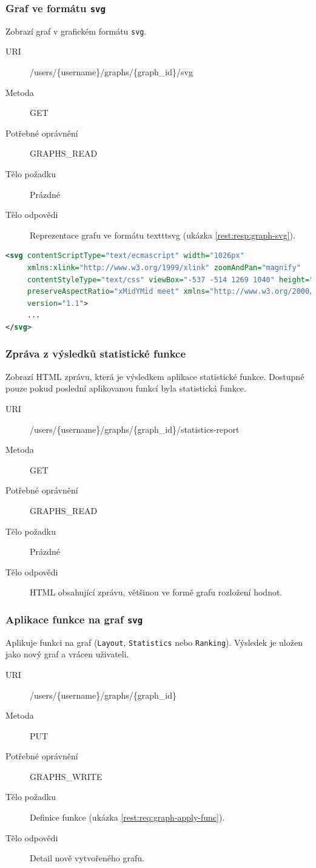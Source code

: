 \documentclass[thesis=M,czech]{FITthesis}[2014/05/6]
\begin{document}
\subsubsection{Graf ve formátu \texttt{svg}}
Zobrazí graf v grafickém formátu \texttt{svg}.
\begin{description}
  \item[URI] /users/\{username\}/graphs/\{graph\_id\}/svg
  \item[Metoda] GET
  \item[Potřebné oprávnění] GRAPHS\_READ
  \item[Tělo požadku] Prázdné
  \item[Tělo odpovědi] Reprezentace grafu ve formátu texttt{svg} (ukázka \ref{rest:resp:graph-svg}). 
\end{description}

\begin{lstlisting}[caption=Tělo odpovědi zdroje /users/\{username\}/graphs/\{graph\_id\}/svg (GET), label=rest:resp:graph-svg, language=xml]
<svg contentScriptType="text/ecmascript" width="1026px"
     xmlns:xlink="http://www.w3.org/1999/xlink" zoomAndPan="magnify"
     contentStyleType="text/css" viewBox="-537 -514 1269 1040" height="841px"
     preserveAspectRatio="xMidYMid meet" xmlns="http://www.w3.org/2000/svg"
     version="1.1">
     ...
</svg>
\end{lstlisting}  

\subsubsection{Zpráva z výsledků statistické funkce}
Zobrazí HTML zprávu, která je výsledkem aplikace statistické funkce. Dostupné pouze pokud poslední aplikovanou funkcí byla statistická funkce.
\begin{description}
  \item[URI] /users/\{username\}/graphs/\{graph\_id\}/statistics-report
  \item[Metoda] GET
  \item[Potřebné oprávnění] GRAPHS\_READ
  \item[Tělo požadku] Prázdné
  \item[Tělo odpovědi] HTML obsahující zprávu, většinou ve formě grafu rozložení hodnot. 
\end{description}


\subsubsection{Aplikace funkce na graf \texttt{svg}}
Aplikuje funkci na graf (\texttt{Layout}, \texttt{Statistics} nebo \texttt{Ranking}). Výsledek je uložen jako nový graf a vrácen uživateli. 
\begin{description}
  \item[URI] /users/\{username\}/graphs/\{graph\_id\}
  \item[Metoda] PUT
  \item[Potřebné oprávnění] GRAPHS\_WRITE
  \item[Tělo požadku] Definice funkce (ukázka \ref{rest:req:graph-apply-func}).
  \item[Tělo odpovědi] Detail nově vytvořeného grafu. 
\end{description}
\end{document}
